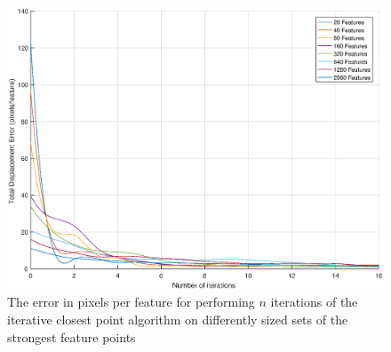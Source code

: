 \documentclass{article}
\begin{document}
\begin{figure}[h]
	\centering
	\includegraphics[width=\textwidth]{figures/alignment/error_for_iterations}
	\caption{The error in pixels per feature for performing $n$ iterations of the iterative closest point algorithm on differently sized sets of the strongest feature points}
	\label{fig_results_error_plot}
\end{figure}
\end{document}
